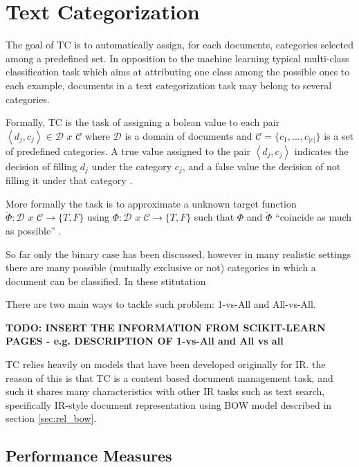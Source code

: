 
\section{Text Categorization}
\label{sec:rel_text_categorization}

The goal of \ac{TC} is to automatically assign, for each
documents, categories selected among a predefined set.
In opposition to the machine learning typical multi-class classification
task which aims at attributing one class among the possible ones to each
example, documents in a text categorization task may belong to several
categories. 


Formally,  \ac{TC} is the  task of  assigning a bolean value to each pair 
$\left\langle d_{j},c_{j}\right\rangle \in\mathcal{D}\,\, x\,\mathcal{\, C}$
where  $\mathcal{D}$  is a domain of documents and
$\mathcal{C}=\{c_{1},\ldots,c_{|c|}\}$ is a set of predefined categories. A
true value assigned to the pair $\left\langle d_{j},c_{j}\right\rangle $
indicates the decision of filling  $d_{j}$ under the category  $c_{j}$, and
a false value the decision of not filling it under that category \cite{Sebastiani02}. 

More formally the task is to approximate a unknown target function 
 $\breve{\Phi}:\mathcal{D}\,\, x\,\mathcal{\, C}\rightarrow\{T,F\}$  using 
 $\Phi:\mathcal{D}\,\, x\,\mathcal{\, C}\rightarrow\{T,F\}$  such that 
 $\Phi$ and  $\breve{\Phi}$ ``coincide as much as possible'' \cite{Sebastiani02}. 

So far only the binary case has been discussed, however in many realistic
settings there are many possible (mutually exclusive or not) categories in
which a document can be classified. In these stitutation 

 There are two main ways to  tackle
such problem: 1-vs-All and All-vs-All. 

\textbf{TODO: INSERT THE INFORMATION FROM SCIKIT-LEARN PAGES - e.g.
  DESCRIPTION OF 1-vs-All and All vs all}

\ac{TC} relies  heavily on  models that have been developed originally for \ac{IR}.
 the reason of this is that \ac{TC} is a content based document management task,
 and such it shares many characteristics with other IR tasks such as text
 search, specifically \ac{IR}-style document representation  using \ac{BOW} model described in section \ref{sec:rel_bow}.



\subsection{Performance Measures}
\label{sec:sub_performance_measures}

